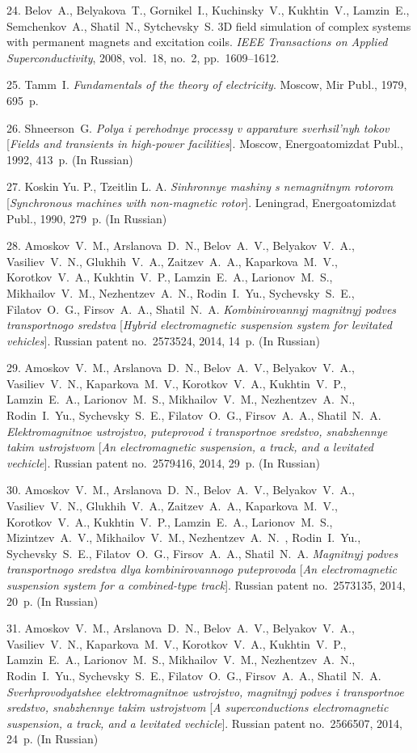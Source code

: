 {24. Belov~A., Belyakova~T., Gornikel~I., Kuchinsky~V., Kukhtin~V.,
Lamzin~E., Semchenkov~A., Shatil~N., Sytchevsky~S. 3D field
simulation of complex systems with permanent magnets and
excitation coils. {\em IEEE Transactions on Applied
Superconductivity}, 2008, vol.~18, no.~2, pp.~1609--1612.

25. Tamm~I. {\em Fundamentals of the theory of electricity}.
Moscow, Mir Publ., 1979, 695~p.

26. Shneerson~G. {\em Polya i perehodnye processy v apparature
sverhsil'nyh tokov} [{\em Fields and transients in high-power
facilities}]. Moscow, Energoatomizdat Publ., 1992, 413~p. (In
Russian)

27. Koskin Yu. P., Tzeitlin L. A. {\em Sinhronnye mashiny s
nemagnitnym rotorom} [{\em Synchronous machi\-nes with
non-magnetic rotor}]. Leningrad, Energoatomizdat Publ., 1990,
279~p. (In Russian)

28. Amoskov~V.~M., Arslanova~D.~N., Belov~A.~V., Belyakov~V.~A.,
Vasiliev~V.~N., Glukhih~V.~A., Zaitzev~A.~A., Kaparkova~M.~V.,
Korotkov~V.~A., Kukhtin~V.~P., Lamzin~E.~A., Larionov~M.~S.,
Mikhailov~V.~M., Nezhentzev~A.~N., Rodin~I.~Yu., Sychevsky~S.~E.,
Filatov~O.~G., Firsov~A.~A., Shatil~N.~A. {\em Kombinirovannyj
magnitnyj podves transportnogo sredstva} [{\em Hybrid
electromagnetic suspension system for levitated vehicles}].
Russian patent no.~2573524, 2014, 14~p. (In Russian)

29. Amoskov~V.~M., Arslanova~D.~N., Belov~A.~V., Belyakov~V.~A.,
Vasiliev~V.~N., Kaparkova~M.~V., Korotkov~V.~A., Kukhtin~V.~P.,
Lamzin~E.~A., Larionov~M.~S., Mikhailov~V.~M., Nezhentzev~A.~N.,
Rodin~I.~Yu., Sychevsky~S.~E., Filatov~O.~G., Firsov~A.~A.,
Shatil~N.~A. {\em Elektromagnitnoe ustrojstvo, puteprovod i
transportnoe sredstvo, snabzhennye takim ustrojstvom} [{\em An
electromagnetic suspension, a track, and a levitated vechicle}].
Russian patent no.~2579416, 2014, 29~p. (In Russian)

30. Amoskov~V.~M., Arslanova~D.~N., Belov~A.~V., Belyakov~V.~A.,
Vasiliev~V.~N., Glukhih~V.~A., Zaitzev~A.~A., Kaparkova~M.~V.,
Korotkov~V.~A., Kukhtin~V.~P., Lamzin~E.~A., Larionov~M.~S.,
Mizintzev~A.~V., Mikhailov~V.~M., Nezhentzev~A.~N.~, Rodin~I.~Yu.,
Sychevsky~S.~E., Filatov~O.~G., Firsov~A.~A., Shatil~N.~A. {\em
Magnitnyj podves transportnogo sredstva dlya kombinirovannogo
puteprovoda} [{\em An electromagnetic suspension system for a
combined-type track}]. Russian patent no.~2573135, 2014, 20~p. (In
Russian)

31. Amoskov~V.~M., Arslanova~D.~N., Belov~A.~V., Belyakov~V.~A.,
Vasiliev~V.~N., Kaparkova~M.~V., Korotkov~V.~A., Kukhtin~V.~P.,
Lamzin~E.~A., Larionov~M.~S., Mikhailov~V.~M., Nezhentzev~A.~N.,
Rodin~I.~Yu., Sychevsky~S.~E., Filatov~O.~G., Firsov~A.~A.,
Shatil~N.~A. {\em Sverhprovodyatshee elektromagnitnoe ustrojstvo,
magnitnyj podves i transportnoe sredstvo, snabzhennye takim
ustrojstvom} [{\em A superconductions electromagnetic suspension,
a track, and a levitated vechicle}]. Russian patent no.~2566507,
2014, 24~p. (In Russian)

}
